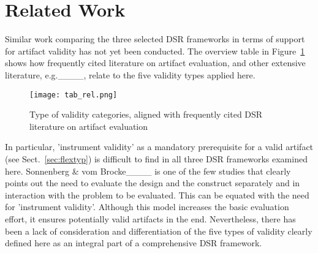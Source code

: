 \section{Related Work}
\label{sec:rel}

Similar work comparing the three selected DSR frameworks in terms of support for artifact validity has not yet been conducted. The overview table in Figure~\ref{fig:tabrel} shows how frequently cited literature on artifact evaluation, and other extensive literature, e.g.____, relate to the five validity types applied here. 

\begin{figure}[htb!]
    \centering
    \texttt{[image: tab\_rel.png]}
    \caption{Type of validity categories, aligned with frequently cited DSR literature on artifact evaluation}
    \label{fig:tabrel}
\end{figure}

In particular, 'instrument validity' as a mandatory prerequisite for a valid artifact (see Sect.~\ref{sec:flextyp}) is difficult to find in all three DSR frameworks examined here. Sonnenberg \& vom Brocke____ is one of the few studies that clearly points out the need to evaluate the design and the construct separately and in interaction with the problem to be evaluated. This can be equated with the need for 'instrument validity'. Although this model increases the basic evaluation effort, it ensures potentially valid artifacts in the end. Nevertheless, there has been a lack of consideration and differentiation of the five types of validity clearly defined here as an integral part of a comprehensive DSR framework.